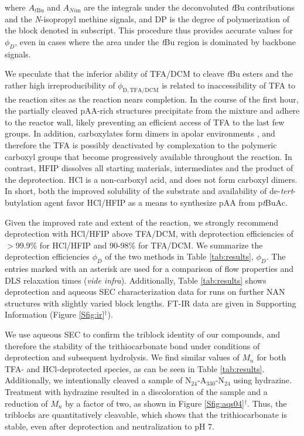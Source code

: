 \documentclass{article}
\begin{document}
where $A_{t\mathrm{Bu}}$ and ${A_{Ni\mathrm{m}}}$ are the integrals under the 
deconvoluted \emph{t}Bu contributions and the
\emph{N}-isopropyl methine signals, and $\mathrm{DP}$ is the degree of polymerization of 
the block denoted in subscript.
This procedure thus provides accurate values for $\phi_{D}$, even in cases where the area under the 
\emph{t}Bu region is dominated by backbone signals.

We speculate that the inferior ability of TFA/DCM to cleave \emph{t}Bu esters and the 
rather high irreproducibility 
of $\phi_\mathrm{D, TFA/DCM}$ is related to inaccessibility of TFA to the reaction sites 
as the reaction nears completion. 
In the course of the first hour, the partially cleaved pAA-rich structures precipitate 
from the mixture and adhere to the reactor wall, likely preventing
an efficient access of TFA to the last few groups. In addition, carboxylates form dimers 
in apolar environments \cite{Fujii1988},
and therefore the TFA is possibly deactivated by complexation to the polymeric carboxyl 
groups that become progressively
available throughout the reaction. In contrast, HFIP dissolves all starting materials, 
intermediates and the product
of the deprotection. HCl is a non-carboxyl acid, and does not form carboxyl dimers. In 
short, both the improved solubility 
of the substrate and availability of de-\emph{tert}-butylation agent favor HCl/HFIP as a
means to synthesize pAA from p\emph{t}BuAc.

Given the improved rate and extent of the reaction, we strongly recommend deprotection 
with HCl/HFIP above TFA/DCM, with deprotection efficiencies of $>$99.9\% for HCl/HFIP 
and 90-98\% for TFA/DCM. We summarize the deprotection efficiencies 
$\phi_{D}$ of the two methods in Table \ref{tab:results}, $\phi_{D}$. 
The entries marked with an asterisk are used for a comparison
of flow properties and DLS relaxation times (\emph{vide infra}). Additionally, 
Table \ref{tab:results} shows deprotection and aqueous SEC characterization data for runs on 
further NAN structures with slightly varied block lengths. FT-IR data are given 
in Supporting Information (Figure \ref{Sfig:ir}$^\dag$).

We use aqueous SEC to confirm the triblock identity of our compounds, and therefore the 
stability of the trithiocarbonate 
bond under conditions of deprotection and subsequent hydrolysis. We find similar values 
of $M_{n}$ for both TFA- and HCl-deprotected
species, as can be seen in Table \ref{tab:results}. Additionally, we intentionally 
cleaved a sample of N$_\mathrm{24}$-A$_\mathrm{330}$-N$_\mathrm{24}$
using hydrazine\cite{Shen2010}. Treatment with hydrazine resulted in a discoloration of 
the sample and a reduction of $M_{n}$ by a factor
of two, as shown in Figure \ref{Sfig:aqs04}$^\dag$. Thus, the triblocks are quantitatively cleavable, 
which shows that the trithiocarbonate is stable, even after deprotection and neutralization to pH 7.
\end{document}
